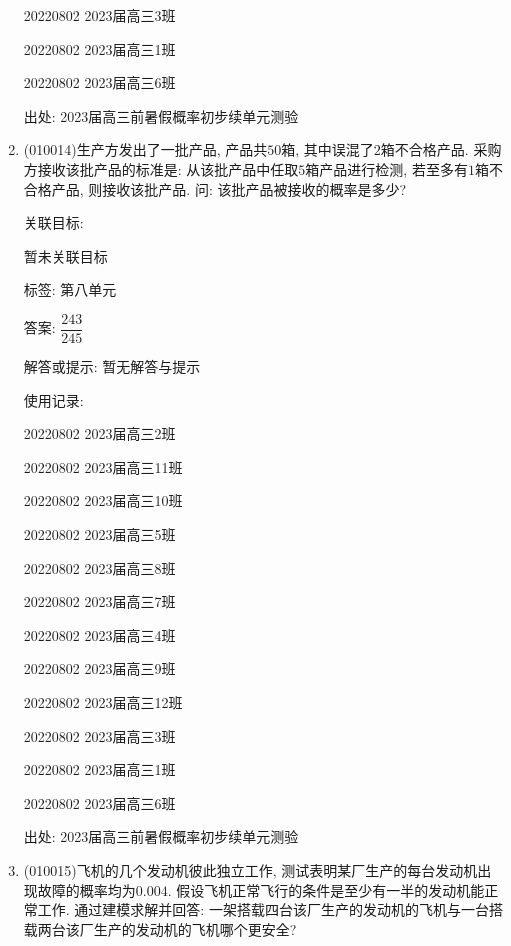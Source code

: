 \documentclass[10pt,a4paper]{article}
\begin{document}
\begin{enumerate}[1.]
20220802	2023届高三3班	

20220802	2023届高三1班	

20220802	2023届高三6班	


出处: 2023届高三前暑假概率初步续单元测验
\item { (010014)}生产方发出了一批产品, 产品共$50$箱, 其中误混了$2$箱不合格产品. 采购方接收该批产品的标准是: 从该批产品中任取$5$箱产品进行检测, 若至多有$1$箱不合格产品, 则接收该批产品. 问: 该批产品被接收的概率是多少?


关联目标:

暂未关联目标



标签: 第八单元

答案: $\dfrac{243}{245}$

解答或提示: 暂无解答与提示

使用记录:

20220802	2023届高三2班	

20220802	2023届高三11班	

20220802	2023届高三10班	

20220802	2023届高三5班	

20220802	2023届高三8班	

20220802	2023届高三7班	

20220802	2023届高三4班	

20220802	2023届高三9班	

20220802	2023届高三12班	

20220802	2023届高三3班	

20220802	2023届高三1班	

20220802	2023届高三6班	


出处: 2023届高三前暑假概率初步续单元测验
\item { (010015)}飞机的几个发动机彼此独立工作, 测试表明某厂生产的每台发动机出现故障的概率均为$0.004$. 假设飞机正常飞行的条件是至少有一半的发动机能正常工作. 通过建模求解并回答: 一架搭载四台该厂生产的发动机的飞机与一台搭载两台该厂生产的发动机的飞机哪个更安全?



\end{enumerate}
\end{document}
